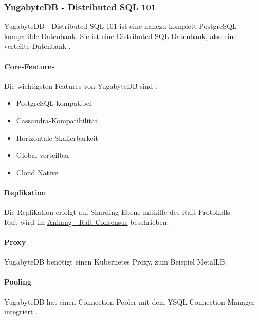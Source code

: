 
\begin{flushleft}
    \subsubsection{YugabyteDB - Distributed SQL 101}
    YugabyteDB - Distributed SQL 101 ist eine nahezu komplett \Gls{PostgreSQL} kompatible Datenbank.
    Sie ist eine Distributed SQL Datenbank, also eine verteilte Datenbank \cite{ZXD6D9KU}.
\end{flushleft}
\begin{flushleft}
    \paragraph{Core-Features}
    Die wichtigsten Features von YugabyteDB sind \cite{N6QKEPAC}:
    \begin{itemize}
        \item \Gls{PostgreSQL} kompatibel
        \item \Gls{Cassandra}-Kompatibilität
        \item Horizontale Skalierbarkeit
        \item Global verteilbar
        \item Cloud Native
    \end{itemize}
\end{flushleft}
\begin{flushleft}
    \paragraph{Replikation}
    Die Replikation erfolgt auf Sharding-Ebene mithilfe des Raft-Protokolls.\\
    Raft wird im \hyperref[subsec:mraft_consensus]{Anhang - Raft-Consensus} beschrieben.
\end{flushleft}
\begin{flushleft}
    \paragraph{Proxy}
    YugabyteDB benötigt einen \Gls{Kubernetes} Proxy, zum Beispiel \Gls{MetalLB}.
\end{flushleft}
\begin{flushleft}
    \paragraph{Pooling}
    YugabyteDB hat einen \Gls{Connection Pooler} mit dem YSQL Connection Manager integriert \cite{2FQ8JXD7}.
\end{flushleft}
